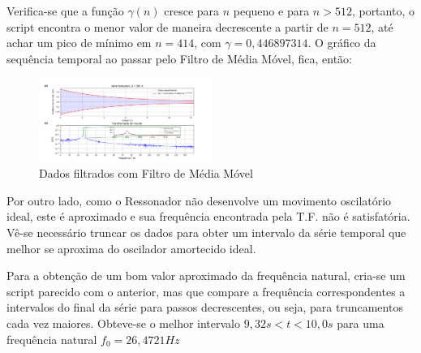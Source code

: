 \documentclass[10pt,a4paper,twocolumn]{article}
\begin{document}
\par Verifica-se que a função $\gamma(n)$ cresce para $n$ pequeno e para $n>512$, portanto, o script encontra o menor valor de maneira decrescente a partir de $n=512$, até achar um pico de mínimo em $n=414$, com $\gamma=0,446897314$. O gráfico da sequência temporal ao passar pelo Filtro de Média Móvel, fica, então:
\begin{figure}[H]
\includegraphics[width=0.5\textwidth, left]{Filtrado}
\caption{Dados filtrados com Filtro de Média Móvel}
\label{fig:filtrado}
\end{figure}
\par Por outro lado, como o Ressonador não desenvolve um movimento oscilatório ideal, este é aproximado e sua frequência encontrada pela T.F. não é satisfatória. Vê-se necessário truncar os dados para obter um intervalo da série temporal que melhor se aproxima do oscilador amortecido ideal. 
\par Para a obtenção de um bom valor aproximado da frequência natural, cria-se um script parecido com o anterior, mas que compare a frequência correspondentes a intervalos do final da série para passos decrescentes, ou seja, para truncamentos cada vez maiores. Obteve-se o melhor intervalo $9,32s<t<10,0s$ para uma frequência natural $f_0=26,4721 Hz$
\end{document}
